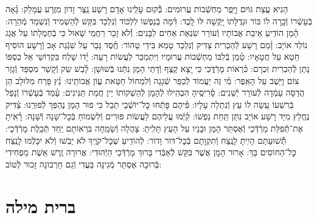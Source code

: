 \documentclass[twoside, openany, parskip=half, 11pt]{book}
\begin{document}
הֵנִיא עֲצַת גּוֹיִם וַיָּֽפֶר מַחְשְֿׁבוֹת עֲרוּמִים: \hfill \break
בְּֿ֗קוּם עָלֵֽינוּ אָדָם רָשָׁע נֵֽצֶר זָדוֹן מִזֶּֽרַע עֲמָלֵק: \hfill \break
גָּ֗אָה בְֿעָשְֿׁרוֹ וְֿכָֽרָה לוֹ בּוֹר וּגְדֻלָּתוֹ יָֽקְֿשָׁה לּוֹ לָֽכֶד: \hfill \break
דִּ֗מָּה בְֿנַפְשׁוֹ לִלְכּוֹד וְֿנִלְכָּד בִּקֵּשׁ לְֿהַשְׁמִיד וְֿנִשְׁמַד מְֿהֵרָה: \hfill \break
הָ֗מָן הוֹדִֽיעַ אֵיבַת אֲבוֹתָיו וְֿעוֹרֵר שִׂנְאַת אַחִים לַבָּנִים: \hfill \break
וְֿ֗לֹא זָכַר רַחֲמֵי שָׁאוּל כִּי בְֿחֶמְלָתוֹ עַל אֲגָג נוֹלַד אוֹיֵב: \hfill \break
זָ֗מַם רָשָׁע לְֿהַכְרִית צַדִּיק וְֿנִלְכַּד טָמֵא בִּידֵי טָהוֹר: \hfill \break
חֶֽ֗סֶד גָּבַר עַל שִׁגְֿגַת אָב וְֿרָשָׁע הוֹסִיף חֵטְא עַל חֲטָאָיו: \hfill \break
טָ֗מַן בְּֿלִבּוֹ מַחְשְֿׁבוֹת עֲרוּמָיו וַיִּתְמַכֵּר לַעֲשׂוֹת רָעָה: \hfill \break
יָ֗דוֹ שָׁלַח בִּקְדֽוֹשֵי אֵל כַּסְפּוֹ נָתַן לְֿהַכְרִית זִכְרָם: \hfill \break
כִּ֗רְאוֹת מָרְֿדֳּכַי כִּי יָֽצָא קֶֽצֶף וְֿדָתֵי הָמָן נִתְּֿנוּ בְּֿשׁוּשָׁן: \hfill \break
לָ֗בַשׁ שַׂק וְֿקָשַׁר מִסְפֵּד וְֿגָזַר צוֹם וַיֵּֽשֶׁב עַל הָאֵֽפֶר: \hfill \break
מִ֗י זֶה יַעֲמוֹד לְֿכַפֵּר שְֿׁגָגָה וְֿלִמְחוֹל חַטַּאת עֲוֹן אֲבוֹתֵֽינוּ: \hfill \break
נֵ֗ץ פָּרַח מִלּוּלָב הֵן הֲדַסָּה עָמְֿדָה לְֿעוֹרֵר יְֿשֵׁנִים: \hfill \break
סָ֗רִיסֶֽיהָ הִבְהִֽילוּ לְֿהָמָן לְֿהַשְׁקוֹתוֹ יֵין חֲמַת תַּנִּינִים: \hfill \break
עָ֗מַד בְֿעָשְֿׁרוֹ וְֿנָפַל בְּֿרִשְׁעוֹ עָֽשָׂה לוֹ עֵץ וְֿנִתְלָה עָלָיו: \hfill \break
פִּ֗יהֶם פָּתְֿחוּ כׇּל־יוֹשְֿׁבֵי תֵבֵל כִּי פוּר הָמָן נֶהְפַּךְ לְֿפוּרֵֽנוּ: \hfill \break
צַ֗דִּיק נֶחֱלַץ מִיַּד רָשָׁע אוֹיֵב נִתַּן תַּֽחַת נַפְשׁוֹ: \hfill \break
קִ֗יְּֿמוּ עֲלֵיהֶם לַעֲשׂוֹת פּוּרִים וְֿלִשְׂמוֹחַ בְּֿכׇל־שָׁנָה וְֿשָׁנָה: \hfill \break
רָ֗אִֽיתָ אֶת־תְּֿֿפִלַּת מָרְֿדְּֿכַי וְֿאֶסְתֵּר הָמָן וּבָנָיו עַל הָעֵץ תָּלִֽיתָ: \hfill \break
{}
צָהֲלָה וְֿשָׂמֵֽחָה בִּרְאוֹתָם יַֽחַד תְּֿכֵֽלֶת מָרְֿדְּֿכָי: \hfill \break
תְּֿ֗שׁוּעָתָם הָיִֽיתָ לָנֶֽצַח וְֿתִקְוָתָם בְּֿכׇל־דּוֹר וָדוֹר: \hfill \break
לְֿהוֹדִֽיעַ שֶׁכׇּל־קֹוֶֽיךָ לֹא יֵבֹֽשׁוּ וְֿלֹא יִכָּלְֿמוּ לָנֶֽצַח כׇּל־הַחוֹסִים בָּךְ: \hfill \break
אָרוּר הָמָן אֲשֶׁר בִּקֵּשׁ לְֿאַבְּֿדִי בָּרוּךְ מָרְֿדְּֿכַי הַיְּֿהוּדִי: \hfill \break
אֲרוּרָה זֶֽרֶשׁ אֵֽשֶׁת מַפְחִידִי בְּֿרוּכָה אֶסְתֵּר מְֿגִינָּה בַּעֲדִי וְֿגַם חַרְבוֹנָה זָכוּר לְֿטּוֹב:

\vfill


\sepline



\chapter[ברית מילה]{ ברית מילה }
\end{document}
